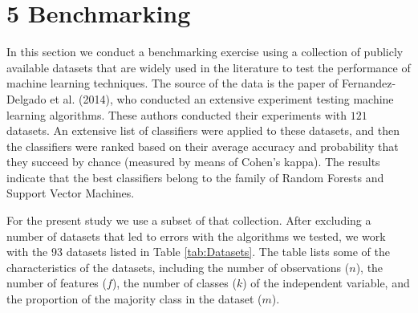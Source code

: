 \documentclass[]{elsarticle} %
\begin{document}
\section{5 Benchmarking}\label{benchmarking}

In this section we conduct a benchmarking exercise using a collection of
publicly available datasets that are widely used in the literature to
test the performance of machine learning techniques. The source of the
data is the paper of Fernandez-Delgado et al. (2014), who conducted an
extensive experiment testing machine learning algorithms. These authors
conducted their experiments with \(121\) datasets. An extensive list of
classifiers were applied to these datasets, and then the classifiers
were ranked based on their average accuracy and probability that they
succeed by chance (measured by means of Cohen's kappa). The results
indicate that the best classifiers belong to the family of Random
Forests and Support Vector Machines.

For the present study we use a subset of that collection. After
excluding a number of datasets that led to errors with the algorithms we
tested, we work with the 93 datasets listed in Table \ref{tab:Datasets}.
The table lists some of the characteristics of the datasets, including
the number of observations (\(n\)), the number of features (\(f\)), the
number of classes (\(k\)) of the independent variable, and the
proportion of the majority class in the dataset (\(m\)).
\end{document}
